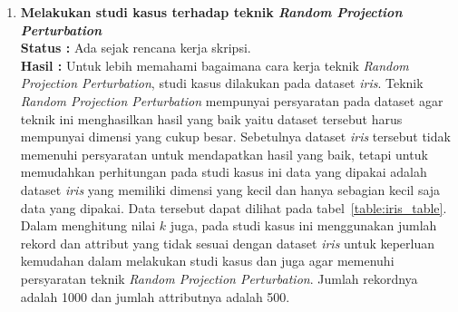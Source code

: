 \documentclass[a4paper,twoside]{article}
\begin{document}
\begin{enumerate}
		\item \textbf{Melakukan studi kasus terhadap teknik \textit{Random Projection Perturbation}}\\
		{\bf Status :} Ada sejak rencana kerja skripsi.\\
		{\bf Hasil :} Untuk lebih memahami bagaimana cara kerja teknik \textit{Random Projection Perturbation}, studi kasus dilakukan pada dataset \textit{iris}. Teknik \textit{Random Projection Perturbation} mempunyai persyaratan pada dataset agar teknik ini menghasilkan hasil yang baik yaitu dataset tersebut harus mempunyai dimensi yang cukup besar. Sebetulnya dataset \textit{iris} tersebut tidak memenuhi persyaratan untuk mendapatkan hasil yang baik, tetapi untuk memudahkan perhitungan pada studi kasus ini data yang dipakai adalah dataset \textit{iris} yang memiliki dimensi yang kecil dan hanya sebagian kecil saja data yang dipakai. Data tersebut dapat dilihat pada tabel~\ref{table:iris_table}. Dalam menghitung nilai \(k\) juga, pada studi kasus ini menggunakan jumlah rekord dan attribut yang tidak sesuai dengan dataset \textit{iris} untuk keperluan kemudahan dalam melakukan studi kasus dan juga agar memenuhi persyaratan teknik \textit{Random Projection Perturbation}. Jumlah rekordnya adalah 1000 dan jumlah attributnya adalah 500.


\end{enumerate}
\end{document}
